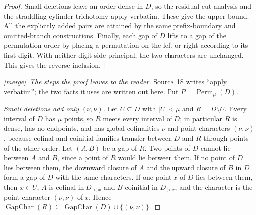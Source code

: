 \documentclass[11pt]{article}
\theoremstyle{definition}
\theoremstyle{remark}
\newcommand{\card}[1]{\lvert #1\rvert}
\newcommand{\merge}{\textsf{[merge]}}
\newcommand{\GapChar}{\operatorname{GapChar}}
\begin{document}
\begin{proof}
Small deletions leave an order dense in $D$, so the residual-cut
analysis and the straddling-cylinder trichotomy apply verbatim.
These give the upper bound.  All the explicitly added pairs are
attained by the same prefix-boundary and omitted-branch constructions.
Finally, each gap of $D$ lifts to a gap of the permutation order by
placing a permutation on the left or right according to its first
digit.  With neither digit side principal, the two characters are
unchanged.  This gives the reverse inclusion.
\end{proof}

\begin{proof}[\merge\ The steps the proof leaves to the reader]
Source~18 writes ``apply verbatim''; the two facts it uses are written out
here. Put $P=\operatorname{Perm}_\mu(D)$.

\emph{Small deletions add only $(\nu,\nu)$.} Let $U\subseteq D$ with
$\card U<\mu$ and $R=D\setminus U$. Every interval of $D$ has $\mu$ points, so
$R$ meets every interval of $D$; in particular $R$ is dense, has no endpoints,
and has global cofinalities $\nu$ and point characters $(\nu,\nu)$, because
cofinal and coinitial families transfer between $D$ and $R$ through points of
the other order. Let $(A,B)$ be a gap of $R$. Two points of $D$ cannot lie
between $A$ and $B$, since a point of $R$ would lie between them. If no point
of $D$ lies between them, the downward closure of $A$ and the upward closure of
$B$ in $D$ form a gap of $D$ with the same characters. If one point $x$ of $D$
lies between them, then $x\in U$, $A$ is cofinal in $D_{<x}$ and $B$ coinitial in
$D_{>x}$, and the character is the point character $(\nu,\nu)$ of $x$. Hence
$\GapChar(R)\subseteq\GapChar(D)\cup\{(\nu,\nu)\}$.


\end{proof}
\end{document}
